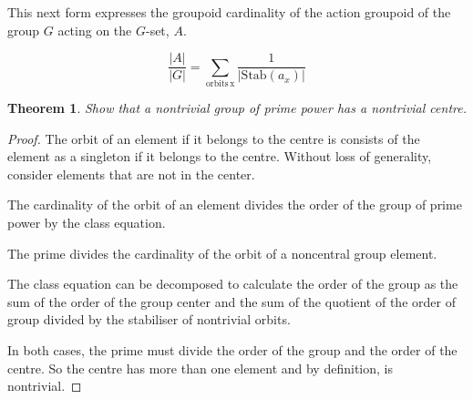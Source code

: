 \documentclass[10pt]{article}
\theoremstyle{plain}%
\newtheorem{theorem}{Theorem}[section]
\theoremstyle{definition}
\theoremstyle{remark}
\begin{document}
This next form expresses the groupoid cardinality of the action groupoid of the group $G$ acting on the $G$-set, $A$.

\begin{equation}
	\dfrac{|A|}{|G|} = \sum_{\mathrm{orbits \, x}}
	\dfrac{1}{|\mathrm{Stab}(a_x)|}
\end{equation}

\begin{theorem}
	Show that a nontrivial group of prime power has a nontrivial centre.
\end{theorem}

\begin{proof}
	The orbit of an element if it belongs to the centre is consists of the element as a singleton if it belongs to the centre. Without loss of generality, consider elements that are not in the center.

	The cardinality of the orbit of an element divides the order of the group of prime power by the class equation. 
	
	The prime divides the cardinality of the orbit of a noncentral group element. 
	
	The class equation can be decomposed to calculate the order of the group as the sum of the order of the group center and the sum of the quotient of the order of group divided by the stabiliser of nontrivial orbits. 
	
	In both cases, the prime must divide the order of the group and the order of the centre. So the centre has more than one element and by definition, is nontrivial.
\end{proof}
\end{document}
